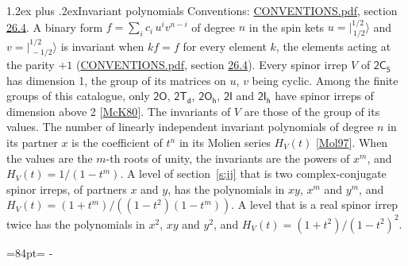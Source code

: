 \documentclass[10pt,a4paper]{article}
\makeatletter
\renewcommand\section{\@startsection{section}{1}{\z@}{-3ex plus -1ex minus -.2ex}%
  {1.2ex plus .2ex}{\normalfont\large\sffamily\bfseries\color{parttitle}}}
\newcommand{\needspace}[1]{\par\penalty-100\begingroup\dimen0=#1\relax\dimen2=\pagegoal
  \advance\dimen2-\pagetotal\ifdim\dimen0>\dimen2\relax\ifdim\dimen2>0pt\vfil\break\fi\fi
  \endgroup}
\numberwithin{equation}{section}
\newcommand{\grp}[1]{\mathsf{#1}}
\newcommand{\jm}[2]{\bigl\lvert{}^{#1}_{\,#2}\bigr\rangle}
\makeatother
\begin{document}
\section{Invariant polynomials}\label{s:invariants}
Conventions: \href{../../CONVENTIONS.pdf}{CONVENTIONS.pdf}, section \href{../../CONVENTIONS.pdf\#conv.26.4}{26.4}.
\leavevmode\label{n:local.binary.form}A binary form $f = \sum_i c_i\, u^i v^{n-i}$ of degree $n$ in the spin kets $u = \jm{1/2}{1/2}$ and $v = \jm{1/2}{-1/2}$ is invariant when $k f = f$ for every element $k$, the elements acting at the parity $+1$ (\href{../../CONVENTIONS.pdf}{CONVENTIONS.pdf}, section \href{../../CONVENTIONS.pdf\#conv.26.4}{26.4}).
\leavevmode\label{n:function.hilbert}Every spinor irrep $V$ of $\grp{2C_{5}}$ has dimension 1, the group of its matrices on $u$, $v$ being cyclic. Among the finite groups of this catalogue, only $\grp{2O}$, $\grp{2T_{d}}$, $\grp{2O_{h}}$, $\grp{2I}$ and $\grp{2I_{h}}$ have spinor irreps of dimension above 2 [\href{../../../REFERENCES.pdf\#ref.McK80}{McK80}]. The invariants of $V$ are those of the group of its values. \label{n:local.partner.x}The number of linearly independent invariant polynomials of degree $n$ in its partner $x$ is the coefficient of $t^n$ in its Molien series $H_V(t)$ [\href{../../../REFERENCES.pdf\#ref.Mol97}{Mol97}]. When the values are the $m$-th roots of unity, the invariants are the powers of $x^{m}$, and $H_V(t) = 1/(1 - t^{m})$. A level of section~\ref{s:jj} that is two complex-conjugate spinor irreps, of partners $x$ and $y$, has the polynomials in $xy$, $x^{m}$ and $y^{m}$, and $H_V(t) = (1 + t^{m})/((1 - t^{2})(1 - t^{m}))$. A level that is a real spinor irrep twice has the polynomials in $x^{2}$, $xy$ and $y^{2}$, and $H_V(t) = (1 + t^{2})/(1 - t^{2})^{2}$.
\needspace{84pt}
\end{document}
